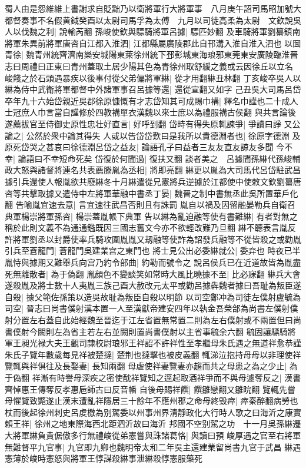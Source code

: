 蜀人由是怨維維上書謝求自貶黜乃以衛將軍行大將軍事　八月庚午詔司馬昭加號大都督奏事不名假黄鉞癸酉以太尉司馬孚為太傅　九月以司徒高柔為太尉　文欽說吳人以伐魏之利|{
	說輸芮翻}
孫峻使欽與驃騎將軍呂據|{
	驃匹妙翻}
及車騎將軍劉纂鎮南將軍朱異前將軍唐咨自江都入淮泗|{
	江都縣屬廣陵郡此自邗溝入淮自淮入泗也}
以圖青徐|{
	魏青州統齊濟南樂安城陽東萊徐州統下邳彭城東海琅邪東莞東安廣陵臨淮晉志曰周禮曰正東曰青州蓋取土居少陽其色為青徐州取舒緩之義或云因徐丘以立名}
峻餞之於石頭遇暴疾以後事付從父弟偏將軍綝|{
	從才用翻綝丑林翻}
丁亥峻卒吳人以綝為侍中武衛將軍都督中外諸軍事召呂據等還|{
	還從宣翻又如字}
己丑吳大司馬呂岱卒年九十六始岱親近吳郡徐原慷慨有才志岱知其可成賜巾褠|{
	釋名巾謹也二十成人士冠庶人巾言當自謹修於四教褠單衣漢魏以來士庶以為禮服褠古侯翻}
與共言論後遂薦拔官至侍御史原性忠壮好直言|{
	好呼到翻}
岱時有得失原輒諫爭|{
	爭讀曰諍}
又公論之|{
	公然於衆中論其得失}
人或以告岱岱歎曰是我所以貴德淵者也|{
	徐原字德淵}
及原死岱哭之甚哀曰徐德淵呂岱之益友|{
	論語孔子曰益者三友友直友諒友多聞}
今不幸|{
	論語曰不幸短命死矣}
岱復於何聞過|{
	復扶又翻}
談者美之　呂據聞孫綝代孫峻輔政大怒與諸督將連名共表薦滕胤為丞相|{
	將即亮翻}
綝更以胤為大司馬代呂岱駐武昌據引兵還使人報胤欲共廢綝冬十月綝遣從兄憲將兵逆據於江都使中使敕文欽劉纂唐咨等共擊取據又遣侍中左將軍華融中書丞丁晏|{
	魏晉之制中書無丞此吳所置華戶化翻}
告喻胤宜速去意|{
	言宜速往武昌否則且有誅罰}
胤自以禍及因留融晏勒兵自衛召典軍楊崇將軍孫咨|{
	楊崇蓋胤帳下典軍}
告以綝為亂迫融等使有書難綝|{
	有者對無之稱於此則文義不為通通鑑既因三國志舊文今亦不欲輕改難乃旦翻}
綝不聼表言胤反許將軍劉丞以封爵使率兵騎攻圍胤胤又刼融等使詐為詔發兵融等不從皆殺之或勸胤引兵至蒼龍門|{
	蒼龍門吳建業宫之東門也}
將士見公出必委綝就公|{
	委弃也}
時夜已半胤恃與據期又難舉兵向宫乃約令部曲|{
	約勒而號令之}
說呂侯兵已在近道故皆為胤盡死無離散者|{
	為于偽翻}
胤顔色不變談笑如常時大風比曉據不至|{
	比必寐翻}
綝兵大會遂殺胤及將士數十人夷胤三族己酉大赦改元太平或勸呂據犇魏者據曰吾耻為叛臣遂自殺|{
	據父範佐孫策以造吳故耻為叛臣自殺以明節}
以司空鄭冲為司徒左僕射盧毓為司空|{
	晉志曰尚書僕射漢本置一人至漢獻帝建安四年以執金吾榮郃為尚書左僕射僕射分置左右蓋自此始經魏至晉迄于江左省置無常置二則為左右僕射或不兩置但曰尚書僕射今闕則左為省主若左右並闕則置尚書僕射以主省事毓余六翻}
毓固讓驃騎將軍王昶光禄大夫王觀司隸校尉琅邪王祥詔不許祥性至孝繼母朱氏遇之無道祥愈恭謹朱氏子覽年數歲每見祥被楚撻|{
	楚荆也撻擊也被皮義翻}
輒涕泣抱持母母以非理使祥覽輒與祥俱往及長娶妻|{
	長知兩翻}
母虐使祥妻覽妻亦趨而共之母患之為之少止|{
	為于偽翻}
祥漸有時譽母深疾之密使酖祥覽知之逕起取酒祥爭而不與母遽奪反之|{
	漢書齊悼惠王傳奪反孝惠巵師古曰反音幡}
自後母賜祥饌|{
	饌雛戀翻又雛睆翻}
覽輒先嘗母懼覽致斃遂止漢末遭亂祥隱居三十餘年不應州郡之命母終毁瘁|{
	瘁秦醉翻病勞也}
杖而後起徐州刺史呂䖍檄為别駕委以州事州界清靜政化大行時人歌之曰海沂之康實賴王祥|{
	徐州之地東際海西北距泗沂故曰海沂}
邦國不空别駕之功　十一月吳孫綝遷大將軍綝負貴倨傲多行無禮峻從弟憲嘗與誅諸葛恪|{
	與讀曰預}
峻厚遇之官至右將軍無難督平九官事|{
	九官即九卿也魏明帝太和二年吳主還建業留尚書九官于武昌}
綝遇憲薄於峻時憲怒與將軍王惇謀殺綝事泄綝殺惇憲服藥死

